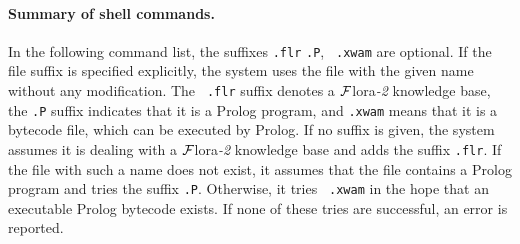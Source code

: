 \documentclass[11pt]{article}
\newcommand{\FLORA}{{\mbox{\sc ${\cal F}${lora}\rm\emph{-2}}}\xspace}
\newcommand{\FLSYSTEM}{\FLORA}
\newcommand{\flrext}{flr\xspace}
\newcommand{\ofile}{xwam}
\begin{document}
\paragraph{Summary of shell commands.}
In the following command list, the suffixes {\tt .\flrext} {\tt .P}, {\tt
  .\ofile} are optional. If the file suffix is specified explicitly, the
system uses the file with the given name without any modification. The {\tt
  .\flrext} suffix denotes a \FLSYSTEM knowledge base, the {\tt .P} suffix indicates that
it is a Prolog program, and {\tt .\ofile} means that it is a bytecode file,
which can be executed by Prolog.  If no suffix is given, the system assumes it
is dealing with a \FLSYSTEM knowledge base and adds the suffix {\tt .\flrext}. If the
file with such a name does not exist, it assumes that the file contains a
Prolog program and tries the suffix {\tt .P}. Otherwise, it tries {\tt
  .\ofile} in the hope that an executable Prolog bytecode exists. If none of
these tries are successful, an error is reported.
%
\end{document}
